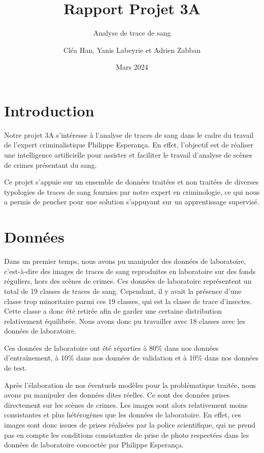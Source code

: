 \documentclass[a4paper]{llncs}
\title{Rapport Projet 3A}
\subtitle{Analyse de trace de sang}
\author{Cléa Han, Yanis Labeyrie et Adrien Zabban}
\institute{Ecole Centrale Méditerranée, 13013 Marseille, France}
\date{Mars 2024}
\begin{document}
\maketitle

\section{Introduction}

Notre projet 3A s'intéresse à l'analyse de traces de sang dans le cadre du travail de l'expert criminalistique Philippe Esperança. En effet, l'objectif est de réaliser une intelligence artificielle pour assister et faciliter le travail d'analyse de scènes de crimes présentant du sang. 

Ce projet s'appuie sur un ensemble de données traitées et non traitées de diverses typologies de traces de sang fournies par notre expert en criminologie, ce qui nous a permis de pencher pour une solution s'appuyant sur un apprentissage supervisé. 

\section{Données}

Dans un premier temps, nous avons pu manipuler des données de laboratoire, c'est-à-dire des images de traces de sang reproduites en laboratoire sur des fonds réguliers, hors des scènes de crimes. Ces données de laboratoire représentent un total de 19 classes de traces de sang. Cependant, il y avait la présence d'une classe trop minoritaire parmi ces 19 classes, qui est la classe de trace d'insectes. Cette classe a donc été retirée afin de garder une certaine distribution relativement équilibrée. Nous avons donc pu travailler avec 18 classes avec les données de laboratoire. 

Ces données de laboratoire ont été réparties à 80\% dans nos données d'entraînement, à 10\% dans nos données de validation et à 10\% dans nos données de test. 


Après l'élaboration de nos éventuels modèles pour la problématique traitée, nous avons pu manipuler des données dites réelles. Ce sont des données prises directement sur les scènes de crimes. Les images sont alors relativement moins consistantes et plus hétérogènes que les données de laboratoire. En effet, ces images sont donc issues de prises réalisées par la police scientifique, qui ne prend pas en compte les conditions consistantes de prise de photo respectées dans les données de laboratoire concoctée par Philippe Esperança. 
\end{document}
